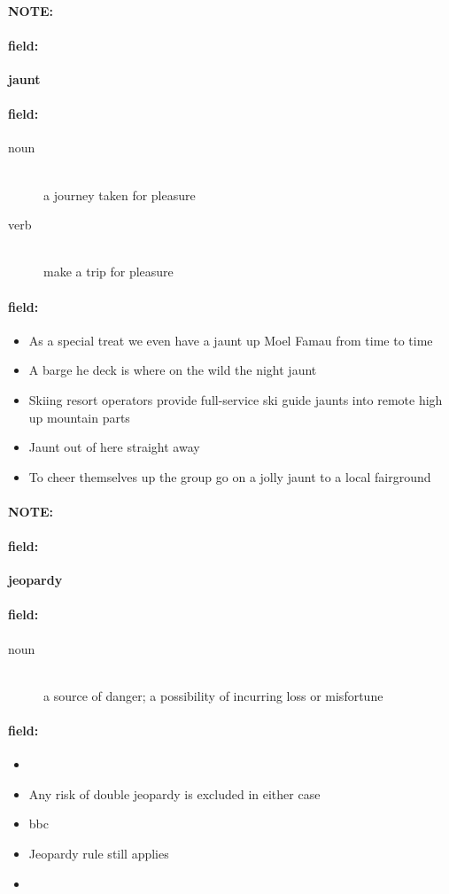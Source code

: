 \documentclass[12pt]{article}
\newenvironment{note}{\paragraph{NOTE:}}{}
\newenvironment{field}{\paragraph{field:}}{}
\begin{document}
\begin{note}
\begin{field}
\textbf{\large jaunt}
\end{field}


\begin{field}
\begin{description}
\item[noun] \hfill \\ 
a journey taken for pleasure

\item[verb] \hfill \\ 
make a trip for pleasure

\end{description}
\end{field}

\begin{field}
\begin{itemize}
\item As a special treat we even have a jaunt up Moel Famau from time to time
\item A barge he deck is where on the wild the night jaunt
\item Skiing resort operators provide full-service ski guide jaunts into remote high up mountain parts
\item Jaunt out of here straight away
\item To cheer themselves up the group go on a jolly jaunt to a local fairground
\end{itemize}
\end{field}
\end{note}
\begin{note}
\begin{field}
\textbf{\large jeopardy}
\end{field}


\begin{field}
\begin{description}
\item[noun] \hfill \\ 
a source of danger; a possibility of incurring loss or misfortune

\end{description}
\end{field}

\begin{field}
\begin{itemize}
\item 
\item Any risk of double jeopardy is excluded in either case
\item bbc
\item Jeopardy rule still applies
\item 
\end{itemize}
\end{field}
\end{note}
\end{document}
